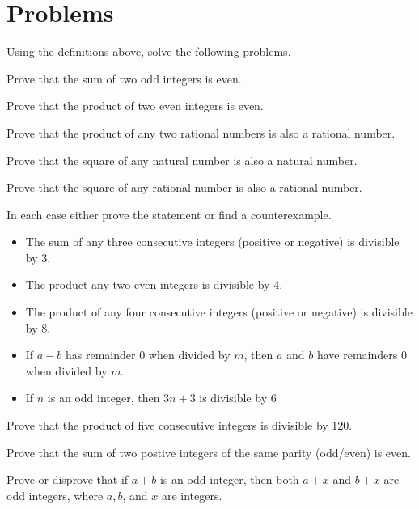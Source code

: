 \documentclass[addpoints]{exam}
\newenvironment{problem}[2][Problem]{\begin{trivlist}
    \item[\hskip \labelsep {\bfseries #1}\hskip \labelsep {\bfseries #2.}]}{\end{trivlist}}
\begin{document}
\section{Problems} 
    Using the definitions above, solve the following problems.
    \begin{problem}{1}
        Prove that the sum of two odd integers is even.
    \end{problem}
    \begin{problem}{2}
        Prove that the product of two even integers is even.
    \end{problem}
    \begin{problem}{3}
        Prove that the product of any two rational numbers is also a rational number.
    \end{problem}
    \begin{problem}{4}
        Prove that the square of any natural number is also a natural number.
    \end{problem}
    \begin{problem}{5}
        Prove that the square of any rational number is also a rational number.
    \end{problem}
    \begin{problem}{6}
        In each case either prove the statement or find a counterexample.
        \begin{itemize}
            \item[(a)] The sum of any three consecutive integers (positive or negative) is divisible by $3$.
            \item[(b)] The product any two even integers is divisible by $4$.
            \item[(c)] The product of any four consecutive integers (positive or negative) is divisible by $8$.
            \item[(d)] If $a - b$ has remainder 0 when divided by $m$, then $a$ and $b$ have remainders $0$ when divided by $m$.
            \item[(e)] If $n$ is an odd integer, then $3n + 3$ is divisible by $6$
        \end{itemize}
    \end{problem}
    \begin{problem}{7}
        Prove that the product of five consecutive integers is divisible by 120.
    \end{problem}
    \begin{problem}{8}
        Prove that the sum of two postive integers of the same parity (odd/even) is even.
    \end{problem}
    \begin{problem}{9}
        Prove or disprove that if $a+b$ is an odd integer, then both $a+x$ and $b+x$ are odd integers,
    where $a,b$, and $x$ are integers.
    \end{problem}
\end{document}
